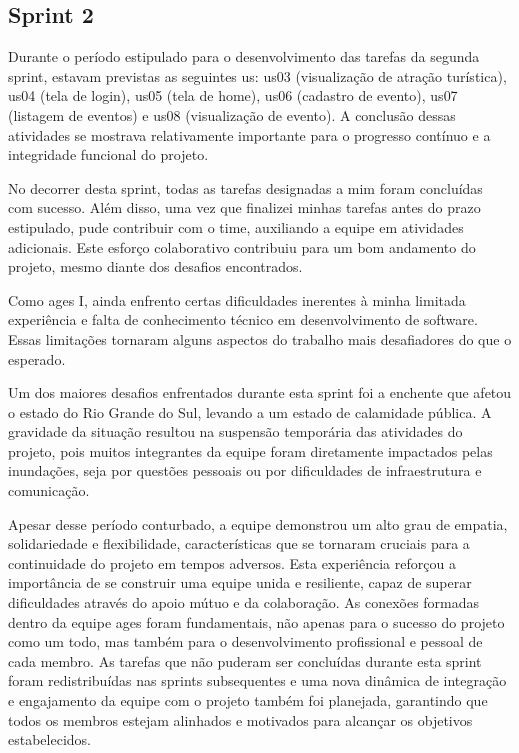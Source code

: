 \subsection{Sprint 2}

Durante o período estipulado para o desenvolvimento das tarefas da segunda sprint, estavam previstas as seguintes \ac{us}: \ac{us}03 (visualização de atração turística), \ac{us}04 (tela de login), \ac{us}05 (tela de home), \ac{us}06 (cadastro de evento), \ac{us}07 (listagem de eventos) e \ac{us}08 (visualização de evento). A conclusão dessas atividades se mostrava relativamente importante para o progresso contínuo e a integridade funcional do projeto.

No decorrer desta sprint, todas as tarefas designadas a mim foram concluídas com sucesso. Além disso, uma vez que finalizei minhas tarefas antes do prazo estipulado, pude contribuir com o time, auxiliando a equipe em atividades adicionais. Este esforço colaborativo contribuiu para um bom andamento do projeto, mesmo diante dos desafios encontrados.

Como \ac{ages} I, ainda enfrento certas dificuldades inerentes à minha limitada experiência e falta de conhecimento técnico em desenvolvimento de software. Essas limitações tornaram alguns aspectos do trabalho mais desafiadores do que o esperado.

Um dos maiores desafios enfrentados durante esta sprint foi a enchente que afetou o estado do Rio Grande do Sul, levando a um estado de calamidade pública. A gravidade da situação resultou na suspensão temporária das atividades do projeto, pois muitos integrantes da equipe foram diretamente impactados pelas inundações, seja por questões pessoais ou por dificuldades de infraestrutura e comunicação.

Apesar desse período conturbado, a equipe demonstrou um alto grau de empatia, solidariedade e flexibilidade, características que se tornaram cruciais para a continuidade do projeto em tempos adversos. Esta experiência reforçou a importância de se construir uma equipe unida e resiliente, capaz de superar dificuldades através do apoio mútuo e da colaboração. As conexões formadas dentro da equipe \ac{ages} foram fundamentais, não apenas para o sucesso do projeto como um todo, mas também para o desenvolvimento profissional e pessoal de cada membro.
As tarefas que não puderam ser concluídas durante esta sprint foram redistribuídas nas sprints subsequentes e uma nova dinâmica de integração e engajamento da equipe com o projeto também foi planejada, garantindo que todos os membros estejam alinhados e motivados para alcançar os objetivos estabelecidos.